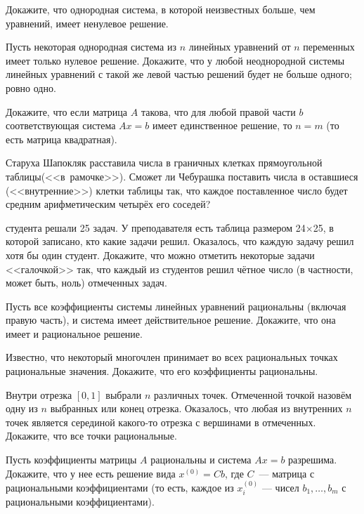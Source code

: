 \documentclass[a4paper,12pt]{article}
\begin{document}
Докажите, что однородная система, в которой неизвестных больше, чем уравнений, имеет ненулевое решение.

 Пусть некоторая однородная система из $n$ линейных уравнений от $n$ переменных имеет только нулевое решение. Докажите, что у любой неоднородной системы линейных уравнений с такой же левой частью решений будет  не больше одного;  ровно одно.


 Докажите, что если матрица $A$ такова, что для любой правой
части $b$ соответствующая система $Ax=b$ имеет единственное решение, то $n = m$
(то есть матрица квадратная).

Старуха Шапокляк
расставила числа в граничных клетках прямоугольной таблицы\break (<<в~рамочке>>). Сможет ли
Чебурашка поставить числа в оставшиеся (<<внутренние>>) клетки таблицы так, что
каждое поставленное число будет средним арифметическим четырёх его
соседей? 

 студента решали 25 задач. У преподавателя есть таблица размером 24$\times$25, в которой записано, кто какие задачи решил. Оказалось, что каждую задачу решил хотя бы один студент. Докажите, что можно отметить некоторые задачи <<галочкой>> так, что каждый из студентов решил чётное число (в частности, может быть, ноль) отмеченных задач. 


 Пусть все коэффициенты системы линейных уравнений рациональны (включая правую часть),
и система имеет действительное решение. Докажите, что она имеет и рациональное решение. 

 Известно, что некоторый многочлен принимает во всех рациональных
точках рациональные значения. Докажите, что его коэффициенты
рациональны. 

 Внутри отрезка $[0,1]$ выбрали $n$ различных точек. Отмеченной точкой назовём одну из $n$ выбранных или конец отрезка. Оказалось, что любая из внутренних $n$ точек является серединой какого-то отрезка с вершинами в отмеченных. Докажите, что все точки рациональные.

 Пусть коэффициенты матрицы $A$ рациональны и система $Ax = b$
разрешима. Докажите, что у нее есть решение вида $x^{(0)} = Cb$,
где $C$~--- матрица с рациональными коэффициентами (то есть, каждое из $x_i^{(0)}$ ---
 чисел $b_1,\ldots,b_m$ с рациональными коэффициентами). 
\end{document}
